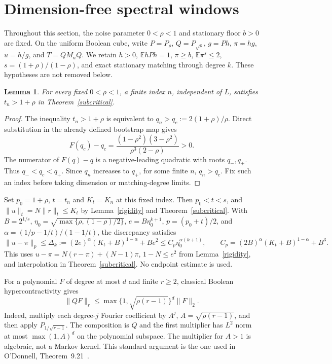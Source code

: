 \documentclass[11pt]{article}
\newtheorem{lemma}[theorem]{Lemma}
\begin{document}
\section{Dimension-free spectral windows}\label{spectralwindows}
Throughout this section, the noise parameter $0<\rho<1$ and stationary
floor $b>0$ are fixed. On the uniform Boolean cube, write
$P=P_\rho$, $Q=P_{\sqrt\rho}$, $g=Ph$, $\pi=hg$, $u=h/g$,
and $T=QM_uQ$. We retain $h>0$, $\mathbb E hPh=1$, $\pi\ge b$,
$\mathbb E\pi^s\le2$, $s=(1+\rho)/(1-\rho)$, and exact stationary
matching through degree $k$. These hypotheses are not removed below.

\begin{lemma}\label{finitecrossing}
For every fixed $0<\rho<1$, a finite index $n$, independent of $L$,
satisfies $t_n>1+\rho$ in Theorem~\ref{subcritical}.
\end{lemma}
\begin{proof}
The inequality $t_n>1+\rho$ is equivalent to
$q_n>q_c:=2(1+\rho)/\rho$. Direct substitution in the already defined
bootstrap map gives
\[
 F(q_c)-q_c=\frac{(1-\rho^2)(3-\rho^2)}{\rho^3(2-\rho)}>0.
\]
The numerator of $F(q)-q$ is a negative-leading quadratic with roots
$q_-,q_+$. Thus $q_-<q_c<q_+$. Since $q_n$ increases to $q_+$,
for some finite $n$, $q_n>q_c$. Fix such an index before taking dimension
or matching-degree limits.
\end{proof}
Set $p_0=1+\rho$, $t=t_n$ and $K_t=K_n$ at this fixed index.
Then $p_0<t<s$, and $\|u\|_t=N\|r\|_t\le K_t$ by
Lemma~\ref{rigidity} and Theorem~\ref{subcritical}.
With $B=2^{1/s}$,
$\eta_0=\sqrt{\max\{\rho,(1-\rho)/2\}}$, $e=B\eta_0^{k+1}$,
$p=(p_0+t)/2$, and
$\alpha=(1/p-1/t)/(1-1/t)$, the discrepancy satisfies
\[
 \|u-\pi\|_p\le\Delta_k
 :=(2e)^\alpha(K_t+B)^{1-\alpha}+Be^2
 \le C_p\eta_0^{\alpha(k+1)},\qquad
 C_p=(2B)^\alpha(K_t+B)^{1-\alpha}+B^3.
\]
This uses $u-\pi=N(r-\pi)+(N-1)\pi$, $1-N\le e^2$ from Lemma~\ref{rigidity}, and interpolation in Theorem~\ref{subcritical}. No endpoint estimate is used.

For a polynomial $F$ of degree at most $d$ and finite $r\ge2$,
classical Boolean hypercontractivity gives
\[
 \|QF\|_r\le\max\{1,\sqrt{\rho(r-1)}\}^{d}\|F\|_2.
\]
Indeed, multiply each degree-$j$ Fourier coefficient by
$A^j$, $A=\sqrt{\rho(r-1)}$, and then apply
$P_{1/\sqrt{r-1}}$. The composition is $Q$ and the first
multiplier has $L^2$ norm at most $\max(1,A)^d$ on the polynomial
subspace. The multiplier for $A>1$ is algebraic, not a Markov kernel.
This standard argument is the one used in O'Donnell, Theorem~9.21~\cite{odonnell}.
\end{document}
